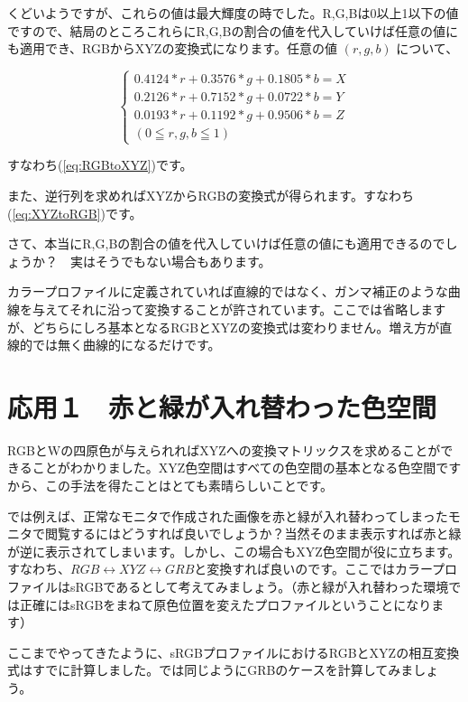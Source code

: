 \documentclass[12pt]{jsarticle}
\begin{document}
くどいようですが、これらの値は最大輝度の時でした。R,G,Bは0以上1以下の値ですので、結局のところこれらにR,G,Bの割合の値を代入していけば任意の値にも適用でき、RGBからXYZの変換式になります。任意の値 $(r,g,b)$ について、

\[
\begin{cases}
0.4124 * r + 0.3576 * g + 0.1805 * b = X \\

0.2126 * r + 0.7152 * g + 0.0722 * b = Y \\

0.0193 * r + 0.1192 * g + 0.9506 * b = Z \\

(0 \leqq r,g,b \leqq 1)
\end{cases}
\]

すなわち(\ref{eq:RGBtoXYZ})です。

また、逆行列を求めればXYZからRGBの変換式が得られます。すなわち(\ref{eq:XYZtoRGB})です。

さて、本当にR,G,Bの割合の値を代入していけば任意の値にも適用できるのでしょうか？　実はそうでもない場合もあります。

カラープロファイルに定義されていれば直線的ではなく、ガンマ補正のような曲線を与えてそれに沿って変換することが許されています。ここでは省略しますが、どちらにしろ基本となるRGBとXYZの変換式は変わりません。増え方が直線的では無く曲線的になるだけです。

\section{応用１　赤と緑が入れ替わった色空間}

RGBとWの四原色が与えられればXYZへの変換マトリックスを求めることができることがわかりました。XYZ色空間はすべての色空間の基本となる色空間ですから、この手法を得たことはとても素晴らしいことです。

では例えば、正常なモニタで作成された画像を赤と緑が入れ替わってしまったモニタで閲覧するにはどうすれば良いでしょうか？当然そのまま表示すれば赤と緑が逆に表示されてしまいます。しかし、この場合もXYZ色空間が役に立ちます。すなわち、$RGB \leftrightarrow XYZ \leftrightarrow GRB$と変換すれば良いのです。ここではカラープロファイルはsRGBであるとして考えてみましょう。（赤と緑が入れ替わった環境では正確にはsRGBをまねて原色位置を変えたプロファイルということになります）

ここまでやってきたように、sRGBプロファイルにおけるRGBとXYZの相互変換式はすでに計算しました。では同じようにGRBのケースを計算してみましょう。
\end{document}
